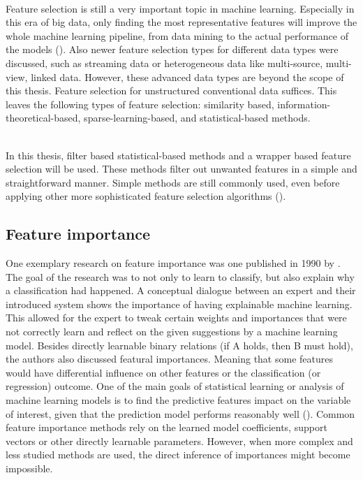 ~\\Feature selection is still a very important topic in machine learning. Especially in this era of big data, only finding the most representative features will improve the whole machine learning pipeline, from data mining to the actual performance of the models (\cite{Li2017-vo}). 
Also newer feature selection types for different data types were discussed, such as streaming data or heterogeneous data like multi-source, multi-view, linked data. However, these advanced data types are beyond the scope of this thesis. Feature selection for unstructured conventional data suffices. This leaves the following types of feature selection: similarity based, information-theoretical-based, sparse-learning-based, and statistical-based methods.

~\\In this thesis, filter based statistical-based methods and a wrapper based feature selection will be used. These methods filter out unwanted features in a simple and straightforward manner. Simple methods are still commonly used, even before applying other more sophisticated feature selection algorithms (\cite{Li2017-vo}).

\subsection{Feature importance}
One exemplary research on feature importance was one published in 1990 by \cite{Porter1990-is}. The goal of the research was to not only to learn to classify, but also explain why a classification had happened. A conceptual dialogue between an expert and their introduced system shows the importance of having explainable machine learning. This allowed for the expert to tweak certain weights and importances that were not correctly learn and reflect on the given suggestions by a machine learning model. Besides directly learnable binary relations (if A holds, then B must hold), the authors also discussed featural importances. Meaning that some features would have differential influence on other features or the classification (or regression) outcome. 
One of the main goals of statistical learning or analysis of machine learning models is to find the predictive features impact on the variable of interest, given that the prediction model performs reasonably well (\cite{Altmann2010-lq}). Common feature importance methods rely on the learned model coefficients, support vectors or other directly learnable parameters. However, when more complex and less studied methods are used, the direct inference of importances might become impossible. 

